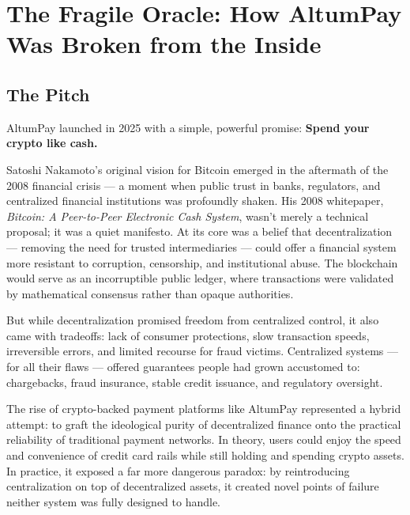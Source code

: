 \section{The Fragile Oracle: How AltumPay Was Broken from the Inside}

\vfill

\subsection{The Pitch}

AltumPay launched in 2025 with a simple, powerful promise:  
\textbf{Spend your crypto like cash.}

Satoshi Nakamoto’s original vision for Bitcoin emerged in the aftermath of the 2008 financial crisis — a moment when public trust in banks, regulators, and centralized financial institutions was profoundly shaken. His 2008 whitepaper, \textit{Bitcoin: A Peer-to-Peer Electronic Cash System}, wasn’t merely a technical proposal; it was a quiet manifesto. At its core was a belief that decentralization — removing the need for trusted intermediaries — could offer a financial system more resistant to corruption, censorship, and institutional abuse. The blockchain would serve as an incorruptible public ledger, where transactions were validated by mathematical consensus rather than opaque authorities.

But while decentralization promised freedom from centralized control, it also came with tradeoffs: lack of consumer protections, slow transaction speeds, irreversible errors, and limited recourse for fraud victims. Centralized systems — for all their flaws — offered guarantees people had grown accustomed to: chargebacks, fraud insurance, stable credit issuance, and regulatory oversight.

The rise of crypto-backed payment platforms like AltumPay represented a hybrid attempt: to graft the ideological purity of decentralized finance onto the practical reliability of traditional payment networks. In theory, users could enjoy the speed and convenience of credit card rails while still holding and spending crypto assets. In practice, it exposed a far more dangerous paradox: by reintroducing centralization on top of decentralized assets, it created novel points of failure neither system was fully designed to handle.

